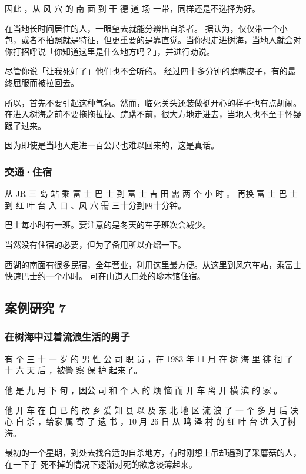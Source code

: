 \documentclass[UTF8]{ctexart}
\begin{document}
因此 ，从 风 穴 的 南 面 到 干 德 道 场 一带，同样还是不选择为好。

在当地长时间居住的人，一眼望去就能分辨出自杀者。
据认为，仅仅带一个小包，或者不拍照就是特征，但更重要的是靠直觉。当你想走进树海，当地人就会对你打招呼说「你知道这里是什么地方吗？」，并进行劝说。

尽管你说「让我死好了」他们也不会听的。
经过四十多分钟的磨嘴皮子，有的最终屈服而被拉回去。

所以，首先不要引起这种气氛。然而，临死关头还装做挺开心的样子也有点胡闹。
在进入树海之前不要拖拖拉拉、踌躇不前，很大方地走进去，当地人也不至于怀疑跟了过来。

因为即使是当地人走进一百公尺也难以回来的，这是真话。

\subsubsection{交通·住宿}

从 JR  三 岛 站 乘 富 士 巴 士 到 富 士 吉 田 需 两 个 小 时 。
再换 富 士 巴 士 到 红 叶 台 入 口 、风 穴 需 三十分到四十分钟。

巴士每小时有一班。要注意的是冬天的车子班次会减少。

当然没有住宿的必要，但为了备用所以介绍一下。

西湖的南面有很多民宿，全年营业，利用这里最方便。从这里到风穴车站，乘富士快速巴士约一个小时。
可在山道入口处的珍木馆住宿。



\subsection{案例研究 7}
\subsubsection*{在树海中过着流浪生活的男子}

有 个 三 十 一 岁 的 男 性 公 司 职 员 ，在 1983 年 11 月 在 树 海 里 徘 徊 了 十 六 天 后 ，被警 察 保 护 起来了。

他 是 九 月 下 旬 ，因公 司 和 个 人 的 烦 恼 而 开 车 离 开 横 滨 的 家 。

他 开 车 在 自 已 的 故 乡 爱 知 县 以 及 东 北 地 区 流 浪 了 一 个 多 月 后 决 心 自 杀 ，给家 属 寄 了 遗 书 ，10 月 26 日 从 鸣 泽 村 的 红 叶 台 进 入了树海。

最初的一个星期，到处去找合适的自杀地方，有时刚想上吊却遇到了采蘑菇的人，在一下子 死不掉的情况下逐渐对死的欲念淡薄起来。
\end{document}
